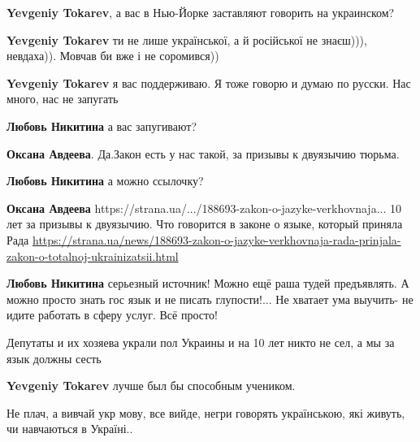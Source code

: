 \begin{itemize}
\textbf{Yevgeniy Tokarev}, а вас в Нью-Йорке заставляют говорить на украинском?

\textbf{Yevgeniy Tokarev} ти не лише української, а й російської не знаєш))), невдаха)). Мовчав би вже і не соромився))

\textbf{Yevgeniy Tokarev} я вас поддерживаю. Я тоже говорю и думаю по русски. Нас много, нас не запугать

\textbf{Любовь Никитина} а вас запугивают?

\textbf{Оксана Авдеева}. Да.Закон есть у нас такой, за призывы к двуязычию тюрьма.

\textbf{Любовь Никитина} а можно ссылочку?

\textbf{Оксана Авдеева} https://strana.ua/.../188693-zakon-o-jazyke-verkhovnaja...
10 лет за призывы к двуязычию. Что говорится в законе о языке, который приняла Рада
\url{https://strana.ua/news/188693-zakon-o-jazyke-verkhovnaja-rada-prinjala-zakon-o-totalnoj-ukrainizatsii.html}

\textbf{Любовь Никитина} серьезный источник!
Можно ещё раша тудей предъявлять.
А можно просто знать гос язык и не писать глупости!... 
Не хватает ума выучить- не идите работать в сферу услуг.
Всё просто!

Депутаты и их хозяева украли пол Украины и на 10 лет никто не сел, а мы за язык должны сесть

\textbf{Yevgeniy Tokarev} лучше был бы способным учеником.
\end{itemize}


Не плач, а вивчай укр мову, все вийде, негри говорять українською, які живуть,
чи навчаються в Україні..

